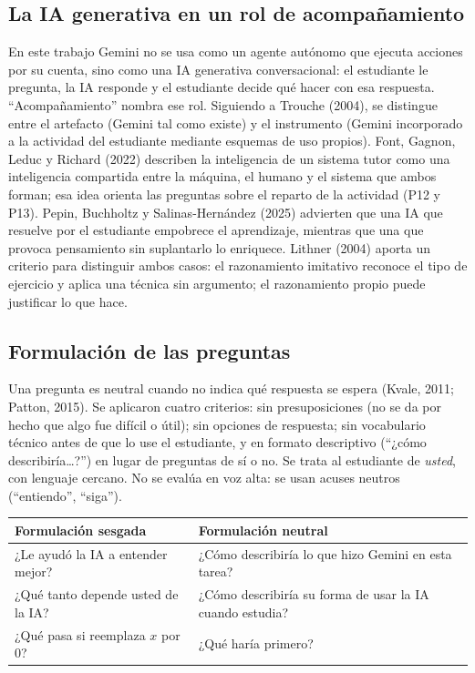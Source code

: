 \documentclass[11pt,letterpaper]{article}
\newcounter{preg}
\begin{document}
\subsection{La IA generativa en un rol de acompañamiento}
En este trabajo Gemini no se usa como un agente autónomo que ejecuta acciones por su cuenta, sino como una IA generativa conversacional: el estudiante le pregunta, la IA responde y el estudiante decide qué hacer con esa respuesta. ``Acompañamiento'' nombra ese rol. Siguiendo a Trouche (2004), se distingue entre el artefacto (Gemini tal como existe) y el instrumento (Gemini incorporado a la actividad del estudiante mediante esquemas de uso propios). Font, Gagnon, Leduc y Richard (2022) describen la inteligencia de un sistema tutor como una inteligencia compartida entre la máquina, el humano y el sistema que ambos forman; esa idea orienta las preguntas sobre el reparto de la actividad (P12 y P13). Pepin, Buchholtz y Salinas-Hernández (2025) advierten que una IA que resuelve por el estudiante empobrece el aprendizaje, mientras que una que provoca pensamiento sin suplantarlo lo enriquece. Lithner (2004) aporta un criterio para distinguir ambos casos: el razonamiento imitativo reconoce el tipo de ejercicio y aplica una técnica sin argumento; el razonamiento propio puede justificar lo que hace.

\subsection{Formulación de las preguntas}\label{sec:neutralidad}
Una pregunta es neutral cuando no indica qué respuesta se espera (Kvale, 2011; Patton, 2015). Se aplicaron cuatro criterios: sin presuposiciones (no se da por hecho que algo fue difícil o útil); sin opciones de respuesta; sin vocabulario técnico antes de que lo use el estudiante, y en formato descriptivo (``¿cómo describiría\ldots?'') en lugar de preguntas de sí o no. Se trata al estudiante de \emph{usted}, con lenguaje cercano. No se evalúa en voz alta: se usan acuses neutros (``entiendo'', ``siga'').

\begin{center}
\small
\renewcommand{\arraystretch}{1.3}
\begin{tabularx}{\linewidth}{@{}LL@{}}
\toprule
\textbf{Formulación sesgada} & \textbf{Formulación neutral}\\
\midrule
¿Le ayudó la IA a entender mejor? & ¿Cómo describiría lo que hizo Gemini en esta tarea?\\
¿Qué tanto depende usted de la IA? & ¿Cómo describiría su forma de usar la IA cuando estudia?\\
¿Qué pasa si reemplaza $x$ por 0? & ¿Qué haría primero?\\
\bottomrule
\end{tabularx}
\end{center}
\end{document}
